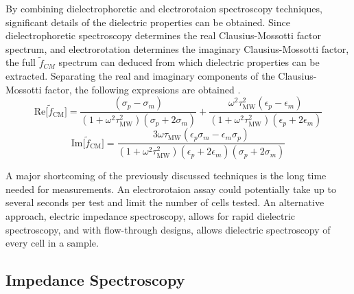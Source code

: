  \par By combining dielectrophoretic and electrorotaion spectroscopy techniques, significant details of the dielectric properties can be obtained. Since dielectrophoretic spectroscopy determines the real Clausius-Mossotti factor spectrum, and electrorotation determines the imaginary Clausius-Mossotti factor, the full $\tilde{f}_{CM}$ spectrum can deduced from which dielectric properties can be extracted. Separating the real and imaginary components of the Clausius-Mossotti factor, the following expressions are obtained \cite{hober_zweites_1912, morgan_single_2007}.
 \begin{equation}
     \text{Re}\big[\tilde{f}_{\text{CM}}\big] = \frac{(\sigma_p - \sigma_m)}{(1+\omega^2\tau_{\text{MW}}^2)(\sigma_p + 2\sigma_m)} + \frac{\omega^2\tau^2_{\text{MW}}(\epsilon_p-\epsilon_m)}{(1+\omega^2\tau_{\text{MW}}^2)(\epsilon_p+2\epsilon_m)}
 \end{equation}
 \begin{equation}
     \text{Im}\big[\tilde{f}_{\text{CM}} \big] = \frac{3\omega\tau_{\text{MW}}(\epsilon_p\sigma_m-\epsilon_m\sigma_p)}{(1+\omega^2\tau^2_{\text{MW}})(\epsilon_p+2\epsilon_m)(\sigma_p+2\sigma_m)}
 \end{equation}
 \par A major shortcoming of the previously discussed techniques is the long time needed for measurements. An electrorotaion assay could potentially take up to several seconds per test and limit the number of cells tested. An alternative approach, electric impedance spectroscopy, allows for rapid dielectric spectroscopy, and with flow-through designs, allows dielectric spectroscopy of every cell in a sample. 
 
 \subsection{Impedance Spectroscopy}
 
